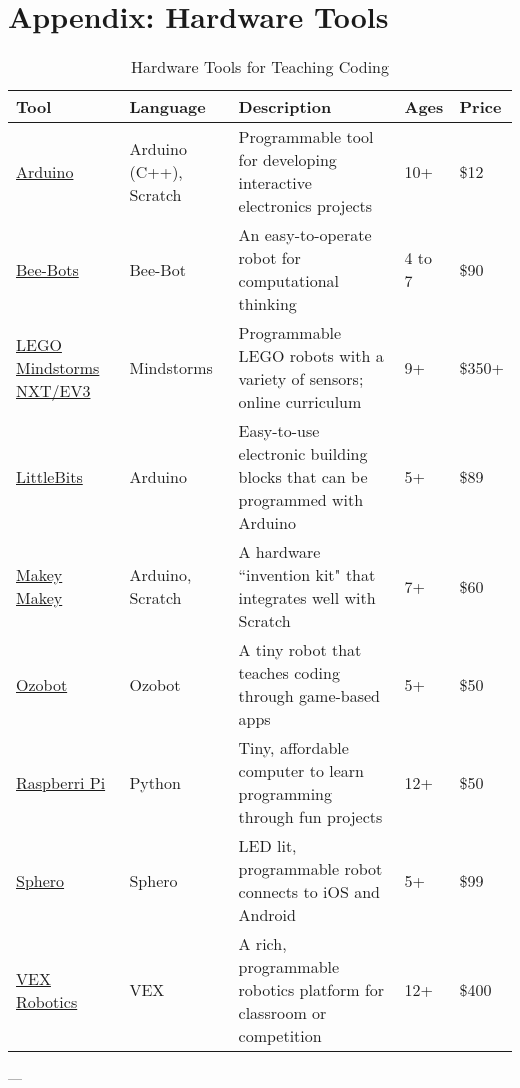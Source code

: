 
\chapter{Appendix: Hardware Tools} %

\label{AppendixHardware} %


\begin{longtable}{p{3.8cm}p{1.8cm}p{4cm}p{1.3cm}p{1.3cm}}
\caption{Hardware Tools for Teaching Coding} \\
\textbf{Tool} & \textbf{Language} & \textbf{Description} & \textbf{Ages} & \textbf{Price} \\ \hline
\href{https://www.arduino.cc/}{Arduino} & Arduino (C++), Scratch & Programmable tool for developing interactive electronics projects & 10+ & \$12\\ \hline
\href{https://www.bee-bot.us/}{Bee-Bots} & Bee-Bot & An easy-to-operate robot for computational thinking & 4 to 7 & \$90\\ \hline
\href{https://education.lego.com/en-us/lesi/middle-school/mindstorms-education-ev3}{LEGO Mindstorms NXT/EV3} & Mindstorms & Programmable LEGO robots with a variety of sensors; online curriculum & 9+ & \$350+\\ \hline
\href{http://littlebits.cc/}{LittleBits} & Arduino & Easy-to-use electronic building blocks that can be programmed with Arduino & 5+ & \$89\\ \hline
\href{http://www.makeymakey.com/}{Makey Makey} & Arduino, Scratch & A hardware ``invention kit" that integrates well with Scratch & 7+ & \$60\\ \hline
\href{http://ozobot.com/}{Ozobot} & Ozobot & A tiny robot that teaches coding through game-based apps & 5+ & \$50\\ \hline
\href{https://www.raspberrypi.org/}{Raspberri Pi} & Python & Tiny, affordable computer to learn programming through fun projects & 12+ & \$50\\ \hline
\href{http://www.sphero.com/}{Sphero} & Sphero & LED lit, programmable robot connects to iOS and Android & 5+ & \$99\\ \hline
\href{http://www.vexrobotics.com/}{VEX Robotics} & VEX & A rich, programmable robotics platform for classroom or competition & 12+ & \$400\\ \hline

\end{longtable}

---

